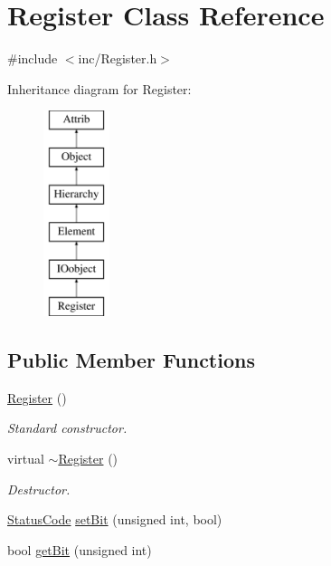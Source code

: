 \hypertarget{classRegister}{}\section{Register Class Reference}
\label{classRegister}


{\ttfamily \#include $<$inc/\+Register.\+h$>$}

Inheritance diagram for Register\+:\begin{figure}[H]
\begin{center}
\leavevmode
\includegraphics[height=6.000000cm]{classRegister}
\end{center}
\end{figure}
\subsection*{Public Member Functions}
\begin{DoxyCompactItemize}
\item 
\hyperlink{classRegister_a669b96861697fb8c04bce79f04390c66}{Register} ()
\begin{DoxyCompactList}\small\item\em Standard constructor. \end{DoxyCompactList}\item 
virtual \hyperlink{classRegister_a27490bda19cd4bd6ca09b48a795fc060}{$\sim$\+Register} ()
\begin{DoxyCompactList}\small\item\em Destructor. \end{DoxyCompactList}\item 
\hyperlink{classStatusCode}{Status\+Code} \hyperlink{classRegister_ab094246dd12aa7e0aa0ca917f4e70b31}{set\+Bit} (unsigned int, bool)
\item 
bool \hyperlink{classRegister_a5d27c9ff548817eee097ba4fdc8e8f69}{get\+Bit} (unsigned int)
\end{DoxyCompactItemize}
